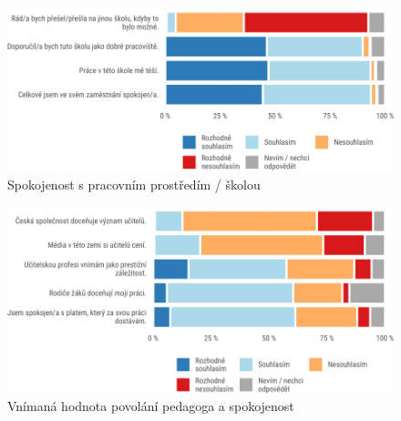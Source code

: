 \documentclass[12pt,a4paper,]{report}
\begin{document}
\begin{figure}

{\centering \includegraphics[width=\textwidth]{figs/tots6q4T3JSENVappdx-1} 

}

\caption{Spokojenost s pracovním prostředím / školou}\label{fig:tots6q4T3JSENVappdx}
\end{figure}

\begin{figure}

{\centering \includegraphics[width=\textwidth]{figs/tots7q1teachperceptappdx-1} 

}

\caption{Vnímaná hodnota povolání pedagoga a spokojenost}\label{fig:tots7q1teachperceptappdx}
\end{figure}
\end{document}
